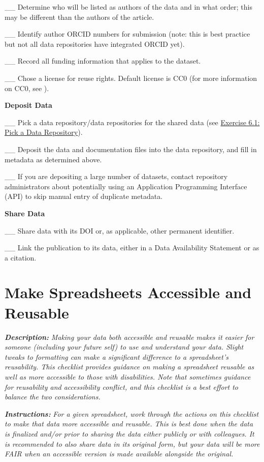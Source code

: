 \documentclass[
]{book}
\begin{document}
\_\_ Determine who will be listed as authors of the data and in what order; this may be different than the authors of the article.

\_\_ Identify author ORCID numbers for submission (note: this is best practice but not all data repositories have integrated ORCID yet).

\_\_ Record all funding information that applies to the dataset.

\_\_ Chose a license for reuse rights. Default license is CC0 (for more information on CC0, see \citep{creative_commons_wiki_cc0_2014}).

\textbf{Deposit Data}

\_\_ Pick a data repository/data repositories for the shared data (see \protect\hyperlink{data-repository}{Exercise 6.1: Pick a Data Repository}).

\_\_ Deposit the data and documentation files into the data repository, and fill in metadata as determined above.

\_\_ If you are depositing a large number of datasets, contact repository administrators about potentially using an Application Programming Interface (API) to skip manual entry of duplicate metadata.

\textbf{Share Data}

\_\_ Share data with its DOI or, as applicable, other permanent identifier.

\_\_ Link the publication to its data, either in a Data Availability Statement or as a citation.

\newpage

\hypertarget{accessible-spreadsheets}{%
\section{Make Spreadsheets Accessible and Reusable}\label{accessible-spreadsheets}}

\textbf{\emph{Description:}} \emph{Making your data both accessible and reusable makes it easier for someone (including your future self) to use and understand your data. Slight tweaks to formatting can make a significant difference to a spreadsheet's reusability. This checklist provides guidance on making a spreadsheet reusable as well as more accessible to those with disabilities. Note that sometimes guidance for reusability and accessibility conflict, and this checklist is a best effort to balance the two considerations.}

\textbf{\emph{Instructions:}} \emph{For a given spreadsheet, work through the actions on this checklist to make that data more accessible and reusable. This is best done when the data is finalized and/or prior to sharing the data either publicly or with colleagues. It is recommended to also share data in its original form, but your data will be more FAIR \citep{wilkinson_fair_2016} when an accessible version is made available alongside the original.}
\end{document}
